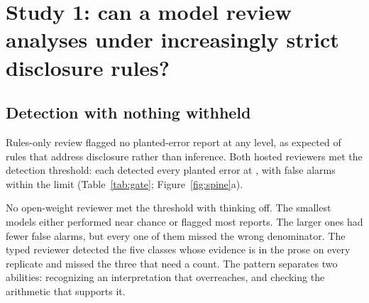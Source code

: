 \section{Study 1: can a model review analyses under increasingly strict disclosure rules?}
\label{sec:results-checkers}

\subsection{Detection with nothing withheld}
\label{sec:results-gate}

Rules-only review flagged no planted-error report at any level, as expected of rules that address disclosure rather than inference. Both hosted reviewers met the detection threshold: each detected every planted error at , with false alarms within the limit (Table~\ref{tab:gate}; Figure~\ref{fig:spine}a).

No open-weight reviewer met the threshold with thinking off. The smallest models either performed near chance or flagged most reports. The larger ones had fewer false alarms, but every one of them missed the wrong denominator. The typed reviewer detected the five classes whose evidence is in the prose on every replicate and missed the three that need a count. The pattern separates two abilities: recognizing an interpretation that overreaches, and checking the arithmetic that supports it.

